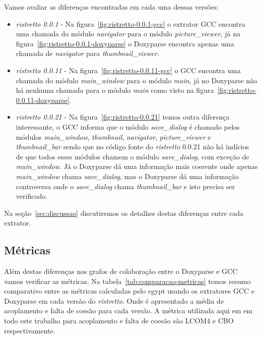 Vamos avaliar as diferenças encontradas em cada uma dessas versões:

\begin{itemize}

\item {\it ristretto 0.0.1} - Na figura~\ref{fig:ristretto-0.0.1-gcc} o
extrator GCC encontra uma chamada do módulo {\it navigator} para o módulo {\it
picture\_viewer}, já na figura~\ref{fig:ristretto-0.0.1-doxyparse} o Doxyparse
encontra apenas uma chamada de {\it navigator} para {\it thumbnail\_viewer}.

\item {\it ristretto 0.0.11} - Na figura~\ref{fig:ristretto-0.0.11-gcc} o GCC
encontra uma chamada do módulo {\it main\_window} para o módulo {\it main}, já
no Doxyparse não há nenhuma chamada para o módulo {\it main} como visto na
figura~\ref{fig:ristretto-0.0.11-doxyparse}. 

\item {\it ristretto 0.0.21} - Na figura~\ref{fig:ristretto-0.0.21} temos outra
diferença interessante, o GCC informa que o módulo {\it save\_dialog} é chamado
pelos módulos {\it main\_window}, {\it thumbnail}, {\it navigator}, {\it
picture\_viewer} e {\it thumbnail\_bar} sendo que no código fonte do {\it
ristretto} 0.0.21 não há indícios de que todos esses módulos chamem o módulo
{\it save\_dialog}, com exceção de {\it main\_window}. Já o Doxyparse dá uma
informação mais coerente onde apenas {\it main\_window} chama {\it
save\_dialog}, mas o Doxyparse dá uma informação controversa onde o {\it
save\_dialog} chama {\it thumbnail\_bar} e isto precisa ser verificado.

\end{itemize}

Na seção~\ref{sec:discussao} discutiremos os detalhes destas diferenças entre cada extrator.

\subsection{Métricas}

Além destas diferenças nos grafos de colaboração entre o Doxyparse e GCC vamos
verificar as métricas. Na tabela~\ref{tab:comparacao-metricas} temos resumo
comparativo entre as métricas calculadas pelo egypt usando os extratores GCC e
Doxyparse em cada versão do {\it ristretto}. Onde é apresentado a média de
acoplamento e falta de coesão para cada versão. A métrica utilizada aqui em em
todo este trabalho para acoplamento e falta de coesão são LCOM4 e CBO
respectivamente.

